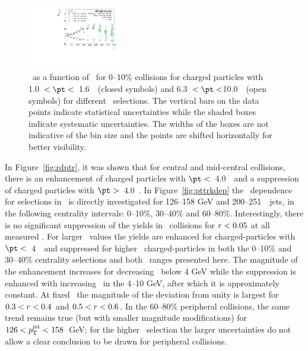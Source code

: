 \begin{figure}[ht]
\centerline{
\includegraphics[width=0.36\textwidth]{figures/results/RDpT_dR_trk3_trk6_cent0} 
}
\caption{\RDptr\ as a function of \rvar\ for 0--10\% collisions for charged particles with 1.0~$< \pt <$~1.6~\GeV\
(closed symbols) and 6.3~$< \pt <$10.0~\GeV\ (open symbols) for different \ptjet\ selections. The vertical bars on the data points indicate statistical uncertainties while the shaded boxes indicate systematic uncertainties. The widths of the boxes are not indicative of the bin size and the points are shifted horizontally for better visibility.}
\label{fig:ptjetdep}
\end{figure}


In Figure~\ref{fig:rdptr}, it was shown that for central and mid-central collisions, there is an enhancement of
charged particles with $\pt <$~4.0~\GeV\ and a suppression of charged particles with $\pt >$~4.0~\GeV.  In
Figure~\ref{fig:pttrkdep} 
the \pt\ dependence for selections in \rvar\ is directly investigated
 for 126--158 GeV and 200--251~\GeV\ jets, in the following centrality intervals: 0--10\%, 30--40\% and 60--80\%.
Interestingly, there is no significant suppression of the yields in \pbpb\ collisions
for $\mbox{$r$} < 0.05$ at all measured \pt.  For larger \rvar\ values the yields are enhanced for charged-particles with $\pt <$~4~\GeV\ and 
suppressed for higher \pt\ charged-particles in both the 0--10\% and 30--40\% centrality selections and both \ptjet\ 
ranges presented here.  The magnitude of the enhancement increases for decreasing \pt\ below 4 GeV while the suppression is enhanced
with increasing \pt\ in the 4--10 GeV, after which it is approximately constant.
At fixed \pt\ the magnitude of the deviation from unity is largest for $0.3< \mbox{$r$} < 0.4$ and $0.5< \mbox{$r$} < 0.6$.
In the 60--80\% peripheral collisions, the same trend remains true (but with smaller magnitude 
modifications) for \mbox{$126 < \mbox{$p_{\mathrm{T}}^{\mathrm{jet}}$} < 158$ GeV}; for the higher \ptjet\ selection the larger uncertainties 
do not allow a clear conclusion to be drawn for peripheral collisions.

